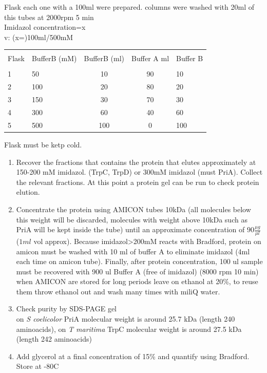 \documentclass[12pt,twoside]{reedthesis}
\begin{document}
  Flask each one with a 100ml were prepared. columns were washed with 20ml
  of this tubes at 2000rpm 5 min\\
  Imidazol concentration=x\\
  v: (x=)100ml/500mM
  
  \label{my-label enzyme}
  
  \begin{tabular}{ l l c c l}
  \hline \\ [-1.5ex]
  Flask & BufferB (mM)   & BufferB (ml)  & Buffer A ml & Buffer B  \\  [1ex]
  \hline \\ [-1.5ex]
  1 & 50& 10&  90& 10 \\  [1ex]
  2 & 100& 20& 80& 20 \\  [1ex]
  3 & 150& 30& 70 & 30 \\  [1ex]
  4 & 300& 60& 40 & 60 \\  [1ex]
  5 & 500& 100& 0& 100 \\  [1ex]
  \hline
  \end{tabular}
  
  Flask must be ketp cold.
  
  \begin{enumerate}
  \def\labelenumi{\arabic{enumi}.}
  \setcounter{enumi}{6}
  \item
    Recover the fractions that contains the protein that elutes
    approximately at 150-200 mM imidazol. (TrpC, TrpD) or 300mM imidazol
    (must PriA). Collect the relevant fractions. At this point a protein
    gel can be run to check protein elution.
  \item
    Concentrate the protein using AMICON tubes 10kDa (all molecules below
    this weight will be discarded, molecules with weight above 10kDa such
    as PriA will be kept inside the tube) until an approximate
    concentration of \(90 \frac{\mu g}{\mu l}\) (\(1ml\) vol approx).
    Because imidazol\textgreater{}200mM reacts with Bradford, protein on
    amicon must be washed with 10 ml of buffer A to eliminate imidazol
    (4ml each time on amicon tube). Finally, after protein concentration,
    100 ul sample must be recovered with 900 ul Buffer A (free of
    imidazol) (8000 rpm 10 min) when AMICON are stored for long periods
    leave on ethanol at 20\%, to reuse them throw ethanol out and wash
    many times with miliQ water.
  \item
    Check purity by SDS-PAGE gel\\
    on \emph{S coelicolor} PriA molecular weight is around 25.7 kDa
    (length 240 aminoacids), on \emph{T maritima} TrpC molecular weight is
    around 27.5 kDa (length 242 aminoacids)
  \item
    Add glycerol at a final concentration of 15\% and quantify using
    Bradford. Store at -80C
  \end{enumerate}
  
\end{document}
